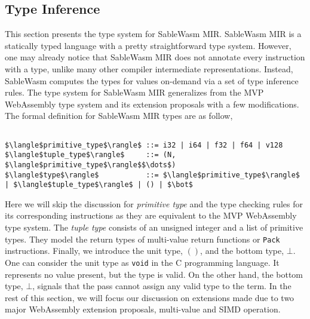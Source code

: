 \subsection{Type Inference}
\label{section:mir-opt-type-inference}

This section presents the type system for SableWasm MIR. SableWasm MIR is a
statically typed language with a pretty straightforward type system. However,
one may already notice that SableWasm MIR does not annotate every instruction
with a type, unlike many other compiler intermediate representations. Instead,
SableWasm computes the types for values on-demand via a set of type inference
rules. The type system for SableWasm MIR generalizes from the MVP WebAssembly
type system and its extension proposals with a few modifications. The
formal definition for SableWasm MIR types are as follow,

\begin{lstlisting}[basicstyle=\linespread{1}\ttfamily, mathescape=true]

$\langle$primitive_type$\rangle$ ::= i32 | i64 | f32 | f64 | v128
$\langle$tuple_type$\rangle$     ::= (N, $\langle$primitive_type$\rangle$$\dots$)
$\langle$type$\rangle$           ::= $\langle$primitive_type$\rangle$ | $\langle$tuple_type$\rangle$ | () | $\bot$

\end{lstlisting}

Here we will skip the discussion for \emph{primitive type} and the type checking
rules for its corresponding instructions as they are equivalent to the MVP
WebAssembly type system. The \emph{tuple type} consists of an unsigned integer
and a list of primitive types. They model the return types of multi-value return
functions or \texttt{Pack} instructions. Finally, we introduce the unit type,
$()$, and the bottom type, $\bot$. One can consider the unit type as
\texttt{void} in the C programming language. It represents no value present,
but the type is valid. On the other hand, the bottom type, $\bot$, signals that
the pass cannot assign any valid type to the term. In the rest of this section,
we will focus our discussion on extensions made due to two major WebAssembly
extension proposals, multi-value and SIMD operation.

